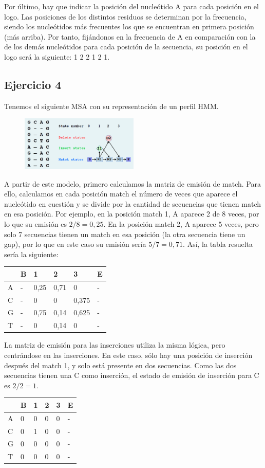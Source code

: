 Por último, hay que indicar la posición del nucleótido A para cada posición en el logo. Las posiciones de los distintos residuos se determinan por la frecuencia, siendo los nucleótidos más frecuentes los que se encuentran en primera posición (más arriba). Por tanto, fijándonos en la frecuencia de A en comparación con la de los demás nucleótidos para cada posición de la secuencia, su posición en el logo será la siguiente: 1 2 2 1 2 1.

\subsection{Ejercicio 4}
Tenemos el siguiente MSA con su representación de un perfil HMM.
\begin{figure}[htbp]
\centering
\includegraphics[width = 0.5\textwidth]{figs/moodle-msa-ej4.png}
\end{figure}

A partir de este modelo, primero calculamos la matriz de emisión de match. Para ello, calculamos en cada posición match el número de veces que aparece el nucleótido en cuestión y se divide por la cantidad de secuencias que tienen match en esa posición. Por ejemplo, en la posición match 1, A aparece 2 de 8 veces, por lo que su emisión es $2/8 = 0,25$. En la posición match 2, A aparece 5 veces, pero solo 7 secuencias tienen un match en esa posición (la otra secuencia tiene un gap), por lo que en este caso su emisión sería $5/7 = 0,71$. Así, la tabla resuelta sería la siguiente:
\begin{table}[htbp]
\centering
\begin{tabular}{l | l l l l l}
& B & 1 & 2 & 3 & E \\ \hline
A & - & 0,25 & 0,71 & 0 & - \\
C & - & 0 & 0 & 0,375 & - \\
G & - & 0,75 & 0,14 & 0,625 & - \\
T & - & 0 & 0,14 & 0 & - 
\end{tabular}
\end{table}

La matriz de emisión para las inserciones utiliza la misma lógica, pero centrándose en las inserciones. En este caso, sólo hay una posición de inserción después del match 1, y solo está presente en dos secuencias. Como las dos secuencias tienen una C como inserción, el estado de emisión de inserción para C es $2/2 = 1$.
\begin{table}[htbp]
\centering
\begin{tabular}{l | l l l l l}
& B & 1 & 2 & 3 & E \\ \hline
A & 0 & 0 & 0 & 0 & - \\
C & 0& 1 & 0 & 0 & - \\
G & 0 & 0 & 0& 0 & - \\
T & 0& 0 & 0 & 0 & - 
\end{tabular}
\end{table}

